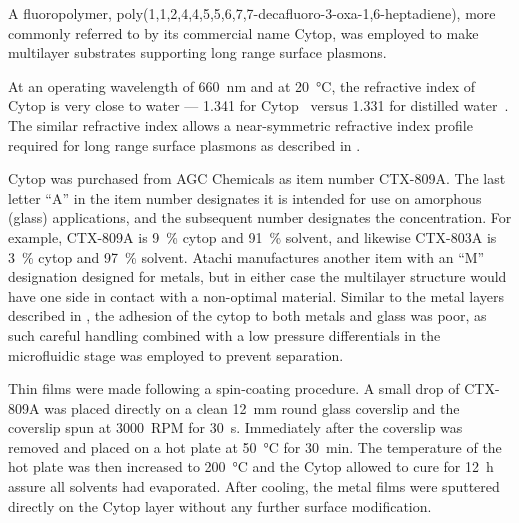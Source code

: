 A fluoropolymer, poly(1,1,2,4,4,5,5,6,7,7-decafluoro-3-oxa-1,6-heptadiene),
more commonly referred to by its commercial name Cytop, was employed to
make multilayer substrates supporting long range surface plasmons.

At an operating wavelength of \SI{660}{\nano\meter} and at
\SI{20}{\celsius}, the refractive index of Cytop is very close to water ---
1.341 for Cytop~\cite{mikevs2005synthesis} versus 1.331 for distilled
water~\cite{andreasson1971measurement}.  The similar refractive index
allows a near-symmetric refractive index profile required for long range
surface plasmons as described in .

Cytop was purchased from AGC Chemicals as item number CTX-809A.  The last
letter ``A'' in the item number designates it is intended for use on amorphous
(glass) applications, and the subsequent number designates the concentration.
For example, CTX-809A is \SI{9}{\percent} cytop and \SI{91}{\percent} solvent,
and likewise CTX-803A is \SI{3}{\percent} cytop and \SI{97}{\percent} solvent.
Atachi manufactures another item with an ``M'' designation designed for
metals, but in either case the multilayer structure would have one side in
contact with a non-optimal material.  Similar to the metal layers described in
, the adhesion of the cytop to both metals and
glass was poor, as such careful handling combined with a low pressure
differentials in the microfluidic stage was employed to prevent separation.

Thin films were made following a spin-coating procedure.  A small drop of
CTX-809A was placed directly on a clean \SI{12}{\milli\meter} round glass
coverslip and the coverslip spun at \SI{3000}{RPM} for \SI{30}{\second}.
Immediately after the coverslip was removed and placed on a hot plate at
\SI{50}{\celsius} for \SI{30}{\minute}.  The temperature of the hot plate was
then increased to \SI{200}{\celsius} and the Cytop allowed to cure for
\SI{12}{\hour} assure all solvents had evaporated.  After cooling, the metal
films were sputtered directly on the Cytop layer without any further surface
modification.

